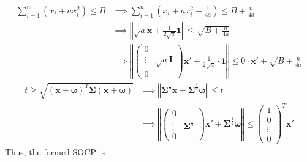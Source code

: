 \documentclass[12pt]{ftec2101}
\newcommand{\matr}[1]{\mathbf{#1}}
\newcommand{\vect}[1]{\mathbf{#1}}
\begin{document}
\begin{align}
    \sum_{i=1}^{n} (x_i + a x_i^2) \leq B &\implies \sum_{i=1}^{n} \left(x_i + a x_i^2+\frac{1}{4a}\right) \leq B+\frac{n}{4a} \\
    &\implies \left \Vert \sqrt{a} \vect{x} + \frac{1}{2\sqrt{a}} \vect{1}\right \Vert \leq \sqrt{B+\frac{n}{4a}} \\
    &\implies \left \Vert 
    \begin{pmatrix}
        0 & \\
        \vdots & \sqrt{a} \matr{I} \\
        0 & 
    \end{pmatrix}\vect{x'} + \frac{1}{2\sqrt{a}} \cdot \vect{1} \right \Vert \leq 0 \cdot \vect{x'} + \sqrt{B+\frac{n}{4a}}
\end{align}
\begin{align}
    t \geq \sqrt{(\vect{x}+\boldsymbol{\omega})^T \boldsymbol{\Sigma} (\vect{x}+\boldsymbol{\omega})} &\implies \left \Vert \boldsymbol{\Sigma}^{\frac{1}{2}} \vect{x} + \boldsymbol{\Sigma}^{\frac{1}{2}}\boldsymbol{\omega}\right \Vert \leq t \\
    &\implies \left \Vert
    \begin{pmatrix}
        0 & \\
        \vdots & \boldsymbol{\Sigma}^{\frac{1}{2}}\\
        0 & 
    \end{pmatrix} \vect{x'} + \boldsymbol{\Sigma}^{\frac{1}{2}} \boldsymbol{\omega} \right \Vert \leq
    \begin{pmatrix}
        1 \\
        0 \\
        \vdots \\
        0
    \end{pmatrix}^T \vect{x'}
\end{align}
Thus, the formed SOCP is 
\end{document}
